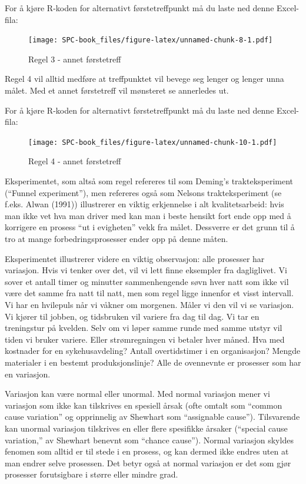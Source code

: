 \documentclass[
]{book}
\begin{document}
For å kjøre R-koden for alternativt førstetreffpunkt må du laste ned denne Excel-fila:

\begin{figure}
\centering
\texttt{[image: SPC-book\_files/figure-latex/unnamed-chunk-8-1.pdf]}
\caption{\label{fig:unnamed-chunk-8}Regel 3 - annet førstetreff}
\end{figure}

Regel 4 vil alltid medføre at treffpunktet vil bevege seg lenger og lenger unna målet. Med et annet førstetreff vil mønsteret se annerledes ut.

For å kjøre R-koden for alternativt førstetreffpunkt må du laste ned denne Excel-fila:

\begin{figure}
\centering
\texttt{[image: SPC-book\_files/figure-latex/unnamed-chunk-10-1.pdf]}
\caption{\label{fig:unnamed-chunk-10}Regel 4 - annet førstetreff}
\end{figure}

Eksperimentet, som altså som regel refereres til som Deming's trakteksperiment (``Funnel experiment''), men refereres også som Nelsons trakteksperiment (se f.eks. Alwan (1991)) illustrerer en viktig erkjennelse i alt kvalitetsarbeid: hvis man ikke vet hva man driver med kan man i beste hensikt fort ende opp med å korrigere en prosess ``ut i evigheten'' vekk fra målet. Dessverre er det grunn til å tro at mange forbedringsprosesser ender opp på denne måten.

Eksperimentet illustrerer videre en viktig observasjon: alle prosesser har variasjon. Hvis vi tenker over det, vil vi lett finne eksempler fra dagliglivet. Vi sover et antall timer og minutter sammenhengende søvn hver natt som ikke vil være det samme fra natt til natt, men som regel ligge innenfor et visst intervall. Vi har en hvilepuls når vi våkner om morgenen. Måler vi den vil vi se variasjon. Vi kjører til jobben, og tidsbruken vil variere fra dag til dag. Vi tar en treningstur på kvelden. Selv om vi løper samme runde med samme utstyr vil tiden vi bruker variere. Eller strømregningen vi betaler hver måned. Hva med kostnader for en sykehusavdeling? Antall overtidstimer i en organisasjon? Mengde materialer i en bestemt produksjonslinje? Alle de ovennevnte er prosesser som har en variasjon.

Variasjon kan være normal eller unormal. Med normal variasjon mener vi variasjon som ikke kan tilskrives en spesiell årsak (ofte omtalt som ``common cause variation'' og opprinnelig av Shewhart som ``assignable cause''). Tilsvarende kan unormal variasjon tilskrives en eller flere spesifikke årsaker (``special cause variation,'' av Shewhart benevnt som ``chance cause''). Normal variasjon skyldes fenomen som alltid er til stede i en prosess, og kan dermed ikke endres uten at man endrer selve prosessen. Det betyr også at normal variasjon er det som gjør prosesser forutsigbare i større eller mindre grad.
\end{document}
